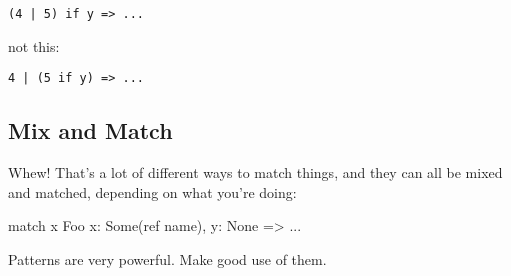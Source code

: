 \begin{verbatim}
(4 | 5) if y => ...
\end{verbatim}

not this:

\begin{verbatim}
4 | (5 if y) => ...
\end{verbatim}

\subsection*{Mix and Match}

Whew! That's a lot of different ways to match things, and they can all be mixed and matched, depending on what you're doing:

\begin{rustc}
match x {
    Foo { x: Some(ref name), y: None } => ...
}
\end{rustc}

Patterns are very powerful. Make good use of them.
